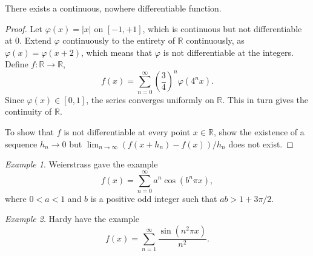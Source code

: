 \documentclass[11pt]{article}
\def\R{\mathbb{R}}
\theoremstyle{definition}
\theoremstyle{remark}
\newtheorem*{example}{Example}
\numberwithin{equation}{module}
\begin{document}
    \begin{theorem}
        There exists a continuous, nowhere differentiable function.
    \end{theorem}
    \begin{proof}
        Let $\varphi(x) = |x|$ on $[-1, +1]$, which is continuous but not
        differentiable at $0$. Extend $\varphi$ continuously to the entirety of $\R$
        continuously, as $\varphi(x) = \varphi(x + 2)$, which means that $\varphi$
        is not differentiable at the integers. Define $f\colon \R \to \R$, \[
            f(x) = \sum_{n = 0}^\infty \left( \frac{3}{4} \right)^n\varphi(4^n x).
        \] Since $\varphi(x) \in [0, 1]$, the series converges uniformly on $\R$.
        This in turn gives the continuity of $\R$.

        To show that $f$ is not differentiable at every point $x \in \R$, show the
        existence of a sequence $h_n \to 0$ but $\lim_{n \to \infty}
        (f(x + h_n) - f(x)) / h_n$ does not exist.
    \end{proof}
    \begin{example}
        Weierstrass gave the example \[
            f(x) = \sum_{n = 0}^\infty a^n\cos(b^n\pi x),
        \] where $0 < a < 1$ and $b$ is a positive odd integer such that $ab > 1 +
        3\pi / 2$.
    \end{example}
    \begin{example}
        Hardy have the example \[
            f(x) = \sum_{n = 1}^\infty \frac{\sin(n^2\pi x)}{n^2}.
        \] 
    \end{example}
\end{document}
